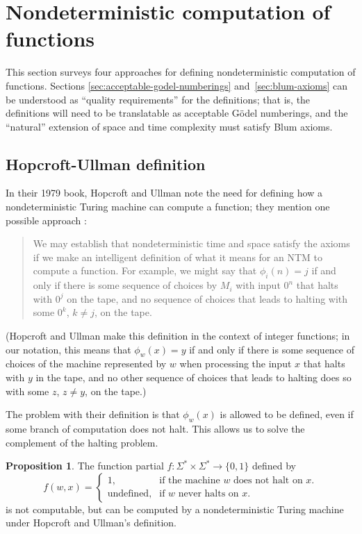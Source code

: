 \documentclass[12pt]{article}
\theoremstyle{definition}
\newtheorem{proposition}[definition]{Proposition}
\begin{document}
\section{Nondeterministic computation of functions}

This section surveys four approaches
for defining nondeterministic computation of functions.
Sections \ref{sec:acceptable-godel-numberings} and~\ref{sec:blum-axioms}
can be understood as ``quality requirements''
for the definitions;
that is, the definitions will need to be translatable as
acceptable Gödel numberings,
and the ``natural'' extension of space and time complexity
must satisfy Blum axioms.

\subsection{Hopcroft-Ullman definition}

In their 1979 book,
Hopcroft and Ullman note the need
for defining how a nondeterministic Turing machine can compute a function;
they mention one possible approach \cite[p.~313]{HopcroftUllman1979}:
\begin{quotation}
    We may establish that nondeterministic time and space
    satisfy the axioms if we make an intelligent definition of what it means
    for an NTM to compute a function.
    For example, we might say that $\phi_i(n) = j$
    if and only if there is some sequence of choices by $M_i$ with input $0^n$
    that halts with $0^j$ on the tape,
    and no sequence of choices that leads to halting with some $0^k$, $k \neq j$,
    on the tape.
\end{quotation}
(Hopcroft and Ullman make this definition in the context of integer functions;
in our notation, this means that $\phi_w(x) = y$
if and only if there is some sequence of choices of the machine represented by $w$
when processing the input $x$ that halts with $y$ in the tape,
and no other sequence of choices that leads to halting does so with some $z$,
$z \neq y$, on the tape.)

The problem with their definition is that $\phi_w(x)$ is allowed to be defined,
even if some branch of computation does not halt.
This allows us to solve the complement of the halting problem.

\begin{proposition}
    The function partial $f: \Sigma^* \times \Sigma^* \to \{0, 1\}$ defined by
    \begin{equation*}
        f(w, x) = \begin{cases}
            1, & \text{if the machine $w$ does not halt on $x$.} \\
            \text{undefined}, &\text{if $w$ never halts on $x$.}
        \end{cases}
    \end{equation*}
    is not computable,
    but can be computed by a nondeterministic Turing machine under
    Hopcroft and Ullman's definition.
\end{proposition}
\end{document}
